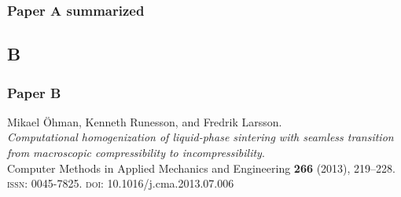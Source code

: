 \documentclass[11pt]{beamer} %
\begin{document}
\begin{frame}
 \frametitle{Paper A summarized}
\begin{center}
 
\end{center}
\end{frame}



\subsection{B}
\begin{frame}
 \frametitle{Paper B}
\begin{center}
Mikael Öhman, Kenneth Runesson, and Fredrik Larsson.
\\[1em]
\textit{Computational homogenization of liquid-phase sintering with seamless transition from
macroscopic compressibility to incompressibility}.
\\[1em]
Computer Methods in Applied Mechanics and Engineering \textbf{266} (2013), 219--228. \textsc{issn}: 0045-7825.
\textsc{doi}: 10.1016/j.cma.2013.07.006
\end{center}
\end{frame}
\end{document}
